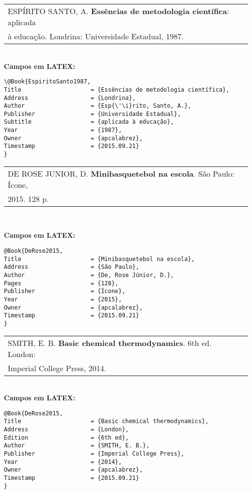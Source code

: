 \begin{tabular}{|l|c|} \hline
 ESPÍRITO SANTO, A. \textbf{Essências de metodologia científica}: aplicada \\
 à educação. Londrina: Universidade Estadual, 1987. \\\hline
\end{tabular}\\

\textbf{Campos em LATEX:}

\begin{verbatim}
\@Book{EspiritoSanto1987,
Title                    = {Essências de metodologia científica},
Address                  = {Londrina},
Author                   = {Esp{\'\i}rito, Santo, A.},
Publisher                = {Universidade Estadual},
Subtitle                 = {aplicada à educação},
Year                     = {1987},
Owner                    = {apcalabrez},
Timestamp                = {2015.09.21}
}
\end{verbatim}

\begin{tabular}{|l|c|} \hline
DE ROSE JUNIOR, D. \textbf{Minibasquetebol na escola}. São Paulo: Ícone, \\ 2015. 128 p. \\\hline
\end{tabular}\\

\newpage

\textbf{Campos em LATEX:}

\begin{verbatim}
@Book{DeRose2015,
Title                    = {Minibasquetebol na escola},
Address                  = {São Paulo},
Author                   = {De, Rose Júnior, D.},
Pages                    = {128},
Publisher                = {Ícone},
Year                     = {2015},
Owner                    = {apcalabrez},
Timestamp                = {2015.09.21}
}
\end{verbatim}

\begin{tabular}{|l|c|} \hline
	SMITH, E. B. \textbf{Basic chemical thermodynamics}. 6th ed. London:\\ Imperial College Press, 2014.  \\\hline
\end{tabular}\\

\textbf{Campos em LATEX:}

\begin{verbatim}
@Book{DeRose2015,
Title                    = {Basic chemical thermodynamics},
Address                  = {London},
Edition                  = {6th ed},
Author                   = {SMITH, E. B.},
Publisher                = {Imperial College Press},
Year                     = {2014},
Owner                    = {apcalabrez},
Timestamp                = {2015.09.21}
}
\end{verbatim}

